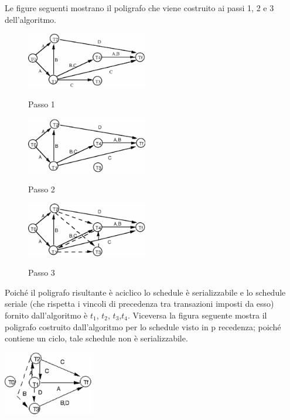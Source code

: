 Le figure seguenti mostrano il poligrafo che viene costruito ai passi 1, 2 e 3 dell'algoritmo.
\begin{center}
\begin{figure}[h!]
\centering
\includegraphics[width=200px]{img_6_3_2(1).eps}

Passo 1
\end{figure}

\begin{figure}[h!]
\centering
\includegraphics[width=200px]{img_6_3_2(2).eps}

Passo 2

\end{figure}

\begin{figure}[h!]
\centering
\includegraphics[width=200px]{img_6_3_2(3).eps}

Passo 3
\end{figure}
\end{center}

Poiché il poligrafo risultante è aciclico lo schedule è serializzabile e lo schedule seriale (che rispetta
i vincoli di precedenza tra transazioni imposti da esso) fornito dall'algoritmo è $t_1$, $t_2$, $t_3$,$t_4$.
Viceversa la figura seguente mostra il poligrafo costruito dall'algoritmo per lo schedule visto in
p recedenza; poiché contiene un ciclo, tale schedule non è serializzabile.
\begin{center}
 \includegraphics[width=150px]{img_6_3_2(4).eps}
\end{center}

